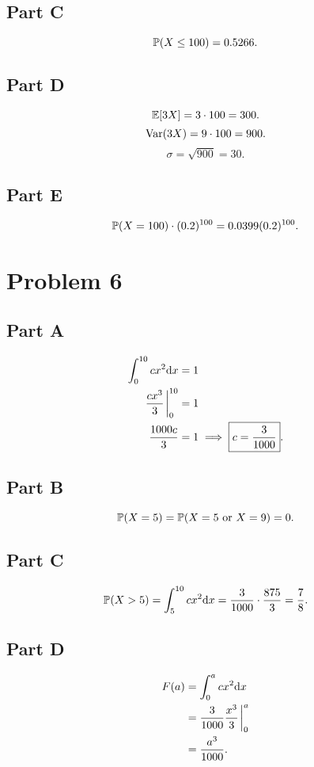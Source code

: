 \documentclass[12pt]{extarticle}
\begin{document}
\subsection*{Part C}
\[
	\mathbb{P}\qty(X \leq 100) = 0.5266
.\]

\subsection*{Part D}
\[
	\mathbb{E}\qty[3X] = 3\cdot 100 = 300
.\]
\[
	\text{Var}\qty(3X) = 9\cdot 100 = 900
.\]
\[
	\sigma = \sqrt{900} = 30
.\]

\subsection*{Part E}
\[
	\mathbb{P}\qty(X = 100)\cdot (0.2)^{100} = 0.0399 (0.2)^{100} 
.\]

\section*{Problem 6}
\subsection*{Part A}
\begin{align*}
	\int_0^{10} cx^2 \dd x &= 1 \\
	\frac{cx^3}{3} \eval_{0}^{10} &= 1 \\
	\frac{1000c}{3} &= 1 \implies \boxed{c = \frac{3}{1000}}
.\end{align*}

\subsection*{Part B}
\[
	\mathbb{P}\qty(X = 5) = \mathbb{P}\qty(X = 5\text{ or }X=9) = 0
.\]

\subsection*{Part C}
\[
	\mathbb{P}\qty(X > 5) = \int_5^{10} cx^2 \dd x = \frac{3}{1000} \cdot \frac{875}{3} = \frac{7}{8}
.\]

\subsection*{Part D}
\begin{align*}
	F(a) &= \int_0^a cx^2 \dd x \\
	&= \frac{3}{1000} \frac{x^3}{3} \eval_0^a \\
	&= \frac{a^3}{1000}
.\end{align*}
\end{document}
